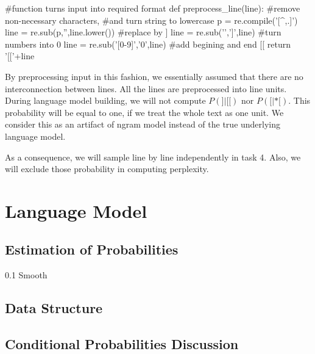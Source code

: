 \documentclass{article}
\begin{document}
\begin{python}

#function turns input into required format
def preprocess_line(line):
    #remove non-necessary characters, 
    #and turn string to lowercase
    p = re.compile('[^\w\s,.]')
    line = re.sub(p,'',line.lower())
    #replace \n by ]
    line = re.sub('\n',']',line)
    #turn numbers into 0
    line = re.sub('[0-9]','0',line)
    #add begining and end [[
    return '[['+line
\end{python}
By preprocessing input in this fashion, we essentially assumed that there are no interconnection between lines. All the lines are preprocessed into line units. During language model building, we will not compute $P(]|[[)$ nor  $P([|*[)$. This probability will be equal to one, if we treat the whole text as one unit. We consider this as an artifact of ngram model instead of the true underlying language model.

As a consequence, we will sample line by line independently in task 4. Also, we will exclude those probability in computing perplexity.

\section{Language Model}

\subsection{Estimation of Probabilities}
0.1 Smooth

\subsection{Data Structure}

\subsection{Conditional Probabilities Discussion}
\end{document}
